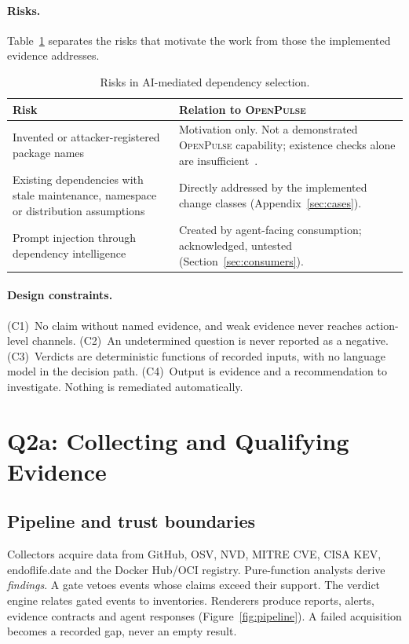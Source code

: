 \documentclass[11pt,a4paper]{article}
\newcommand{\op}{\textsc{OpenPulse}}
\begin{document}
\paragraph{Risks.} Table~\ref{tab:risks} separates the risks that
motivate the work from those the implemented evidence addresses.

\begin{table}[t]
\centering
\footnotesize
\begin{tabularx}{\linewidth}{@{}>{\raggedright\arraybackslash}p{4.2cm} >{\raggedright\arraybackslash}X@{}}
\toprule
Risk & Relation to \op{} \\
\midrule
Invented or attacker-registered package names & Motivation only. Not a
  demonstrated \op{} capability; existence checks alone are
  insufficient~\cite{spracklen2025package}. \\
Existing dependencies with stale maintenance, namespace or
  distribution assumptions & Directly addressed by the implemented
  change classes (Appendix~\ref{sec:cases}). \\
Prompt injection through dependency intelligence & Created by
  agent-facing consumption; acknowledged, untested
  (Section~\ref{sec:consumers}). \\
\bottomrule
\end{tabularx}
\caption{Risks in AI-mediated dependency selection.}
\label{tab:risks}
\end{table}

\paragraph{Design constraints.} (C1)~No claim without named evidence,
and weak evidence never reaches action-level channels. (C2)~An
undetermined question is never reported as a negative.
(C3)~Verdicts are deterministic functions of recorded inputs, with no
language model in the decision path. (C4)~Output is evidence and a
recommendation to investigate. Nothing is remediated automatically.

\section{Q2a: Collecting and Qualifying Evidence}
\label{sec:model}

\subsection{Pipeline and trust boundaries}
Collectors acquire data from GitHub, OSV, NVD, MITRE CVE, CISA KEV,
endoflife.date and the Docker Hub/OCI registry. Pure-function analysts
derive \emph{findings}. A gate vetoes events whose claims exceed their
support. The verdict engine relates gated events to inventories.
Renderers produce reports, alerts, evidence contracts and agent
responses (Figure~\ref{fig:pipeline}). A failed acquisition becomes a
recorded gap, never an empty result.
\end{document}
